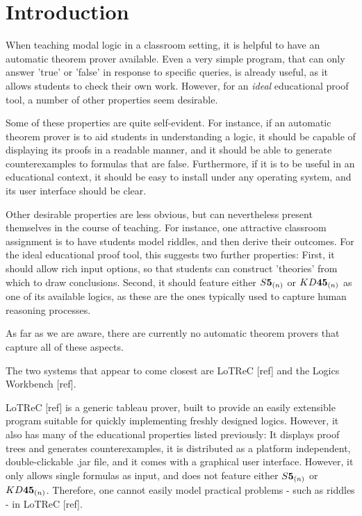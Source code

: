 \section{Introduction}
When teaching modal logic in a classroom setting, it is helpful to have an automatic theorem prover available. Even a very simple program, that can only answer 'true' or 'false' in response to specific queries, is already useful, as it allows students to check their own work. However, for an {\it ideal} educational proof tool,  a number of other properties seem desirable.

Some of these properties are quite self-evident. For instance, if an automatic theorem prover is to aid students in understanding a logic, it should be capable of displaying its proofs in a readable manner, and it should be able to generate counterexamples to formulas that are false. Furthermore, if it is to be useful in an educational context, it should be easy to install under any operating system, and its user interface should be clear.

Other desirable properties are less obvious, but can nevertheless present themselves in the course of teaching. For instance, one attractive classroom assignment is to have students model riddles, and then derive their outcomes. For the ideal educational proof tool, this suggests two further properties: First, it should allow rich input options, so that students can construct 'theories' from which to draw conclusions. Second, it should feature either $\mathbf\mathit{S}\textbf{5}_{(n)}$ or $\mathbf\mathit{KD}\textbf{45}_{(n)}$ as one of its available logics, as these are the ones typically used to capture human reasoning processes.

As far as we are aware, there are currently no automatic theorem provers that capture all of these aspects. 

 The two systems that appear to come closest are LoTReC [ref]  and the Logics Workbench [ref]. 

LoTReC [ref] is a generic tableau prover, built to provide an easily extensible program suitable for quickly implementing freshly designed logics. However, it also has many of the educational properties listed previously: It displays proof trees and generates counterexamples, it is distributed as a platform independent, double-clickable .jar file, and it comes with a graphical user interface. However, it only allows single formulas as input, and does not feature either $\mathbf\mathit{S}\textbf{5}_{(n)}$ or $\mathbf\mathit{KD}\textbf{45}_{(n)}$. Therefore, one cannot easily model practical problems - such as riddles - in LoTReC [ref].

